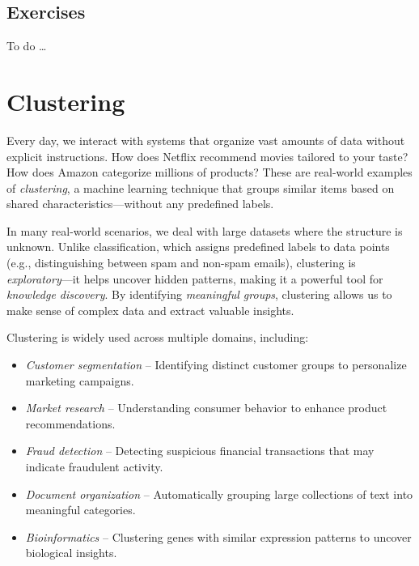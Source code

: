 \documentclass[
]{book}
\providecommand{\tightlist}{%
  \setlength{\itemsep}{0pt}\setlength{\parskip}{0pt}}
\theoremstyle{definition}
\theoremstyle{definition}
\theoremstyle{definition}
\theoremstyle{definition}
\theoremstyle{remark}
\begin{document}
\section{Exercises}\label{exercises-8}

To do \ldots{}

\chapter{Clustering}\label{chapter-cluster}

Every day, we interact with systems that organize vast amounts of data without explicit instructions. How does Netflix recommend movies tailored to your taste? How does Amazon categorize millions of products? These are real-world examples of \emph{clustering}, a machine learning technique that groups similar items based on shared characteristics---without any predefined labels.

In many real-world scenarios, we deal with large datasets where the structure is unknown. Unlike classification, which assigns predefined labels to data points (e.g., distinguishing between spam and non-spam emails), clustering is \emph{exploratory}---it helps uncover hidden patterns, making it a powerful tool for \emph{knowledge discovery}. By identifying \emph{meaningful groups}, clustering allows us to make sense of complex data and extract valuable insights.

Clustering is widely used across multiple domains, including:

\begin{itemize}
\tightlist
\item
  \emph{Customer segmentation} -- Identifying distinct customer groups to personalize marketing campaigns.\\
\item
  \emph{Market research} -- Understanding consumer behavior to enhance product recommendations.\\
\item
  \emph{Fraud detection} -- Detecting suspicious financial transactions that may indicate fraudulent activity.\\
\item
  \emph{Document organization} -- Automatically grouping large collections of text into meaningful categories.\\
\item
  \emph{Bioinformatics} -- Clustering genes with similar expression patterns to uncover biological insights.
\end{itemize}
\end{document}
